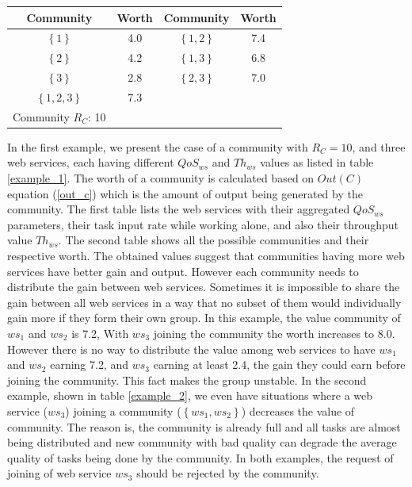 \documentclass[10pt,journal,cspaper,compsoc]{IEEEtran}
\begin{document}
\begin{table}[!t]
\renewcommand{\arraystretch}{1.3}
\label{example_2_2}
\centering
\begin{tabular}{c c || c c}
\hline
Community & Worth & Community & Worth\\
\hline
$\left\{1\right\}$ & 4.0 & $\left\{1,2\right\}$ & 7.4\\
$\left\{2\right\}$ & 4.2 & $\left\{1,3\right\}$ & 6.8\\
$\left\{3\right\}$ & 2.8 & $\left\{2,3\right\}$ & 7.0\\
$\left\{1,2,3\right\}$ & 7.3\\
\hline
Community $R_C$: 10\\
\hline
\end{tabular}
\end{table}

In the first example,  we present the case of a community with $R_C =10 $, and three web services, each having different $QoS_{ws}$ and $Th_{ws}$ values as listed in table \ref{example_1}. The worth of a community is calculated based on $Out(C)$ equation (\ref{out_c}) which is the amount of output being generated by the community. The first table  lists the web services with their aggregated $QoS_{ws}$ parameters, their task input rate while working alone, and also their  throughput value $Th_{ws}$. The second table shows all the possible communities and their respective worth. The obtained values suggest that  communities having more web services have better gain and output. However each community needs to  distribute the gain between web services. Sometimes it is impossible to share the gain between all web services in a way that no subset of them would individually gain more if they form their own group. In this example, the value community of ${ws_1}$ and ${ws_2}$ is 7.2, With ${ws_3}$ joining the community the worth increases to 8.0. However there is no way to distribute the value among web services to have  ${ws_1}$ and ${ws_2}$  earning 7.2, and ${ws_3}$ earning at least 2.4, the gain they could earn before joining the community. This fact makes the group unstable. In the second  example, shown in table \ref{example_2}, we even have situations where a web service (${ws_3}$) joining a community ($\left\{ws_1,ws_2\right\}$) decreases the value of community. The reason is, the community is already full and all tasks are almost being distributed and new community with bad quality can degrade the average quality of tasks being done by the community. In both examples, the request of joining of web service ${ws_3}$ should be rejected by the community.
\end{document}
